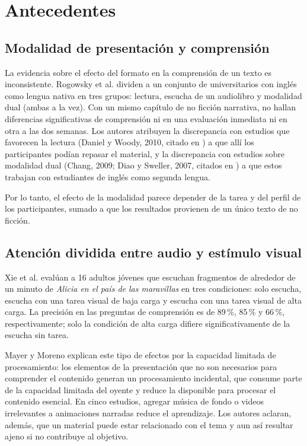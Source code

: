 \documentclass[journal]{IEEEtran}
\begin{document}
\section{Antecedentes}
 
\subsection{Modalidad de presentación y comprensión}
La evidencia sobre el efecto del formato en la comprensión de un texto es inconsistente. Rogowsky et al. \cite{rogowsky2016} dividen a un conjunto de universitarios con inglés como lengua nativa en tres grupos: lectura, escucha de un audiolibro y modalidad dual (ambas a la vez). Con un mismo capítulo de no ficción narrativa, no hallan diferencias significativas de comprensión ni en una evaluación inmediata ni en otra a las dos semanas. Los autores atribuyen la discrepancia con estudios que favorecen la lectura (Daniel y Woody, 2010, citado en \cite{rogowsky2016}) a que allí los participantes podían repasar el material, y la discrepancia con estudios sobre modalidad dual (Chang, 2009; Diao y Sweller, 2007, citados en \cite{rogowsky2016}) a que estos trabajan con estudiantes de inglés como segunda lengua.
 
Por lo tanto, el efecto de la modalidad parece depender de la tarea y del perfil de los participantes, sumado a que los resultados provienen de un único texto de no ficción.
 
\subsection{Atención dividida entre audio y estímulo visual}
Xie et al. \cite{xie2023} evalúan a 16 adultos jóvenes que escuchan fragmentos de alrededor de un minuto de \textit{Alicia en el país de las maravillas} en tres condiciones: solo escucha, escucha con una tarea visual de baja carga y escucha con una tarea visual de alta carga. La precisión en las preguntas de comprensión es de 89\,\%, 85\,\% y 66\,\%, respectivamente; solo la condición de alta carga difiere significativamente de la escucha sin tarea.
 
Mayer y Moreno \cite{mayermoreno2003} explican este tipo de efectos por la capacidad limitada de procesamiento: los elementos de la presentación que no son necesarios para comprender el contenido generan un procesamiento incidental, que consume parte de la capacidad limitada del oyente y reduce la disponible para procesar el contenido esencial. En cinco estudios, agregar música de fondo o videos irrelevantes a animaciones narradas reduce el aprendizaje. Los autores aclaran, además, que un material puede estar relacionado con el tema y aun así resultar ajeno si no contribuye al objetivo.
 
\end{document}
